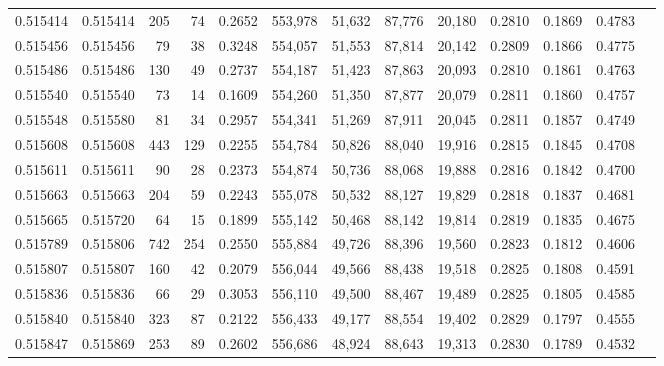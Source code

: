\begin{tabular}{rrrrrrrrrrrrr}
0.515414 & 0.515414 &   205 &    74 &                                     0.2652 & 553,978 &  51,632 &  87,776 &  20,180 & 0.2810 & 0.1869 & 0.4783 \\
0.515456 & 0.515456 &    79 &    38 &                                     0.3248 & 554,057 &  51,553 &  87,814 &  20,142 & 0.2809 & 0.1866 & 0.4775 \\
0.515486 & 0.515486 &   130 &    49 &                                     0.2737 & 554,187 &  51,423 &  87,863 &  20,093 & 0.2810 & 0.1861 & 0.4763 \\
0.515540 & 0.515540 &    73 &    14 &                                     0.1609 & 554,260 &  51,350 &  87,877 &  20,079 & 0.2811 & 0.1860 & 0.4757 \\
0.515548 & 0.515580 &    81 &    34 &                                     0.2957 & 554,341 &  51,269 &  87,911 &  20,045 & 0.2811 & 0.1857 & 0.4749 \\
0.515608 & 0.515608 &   443 &   129 &                                     0.2255 & 554,784 &  50,826 &  88,040 &  19,916 & 0.2815 & 0.1845 & 0.4708 \\
0.515611 & 0.515611 &    90 &    28 &                                     0.2373 & 554,874 &  50,736 &  88,068 &  19,888 & 0.2816 & 0.1842 & 0.4700 \\
0.515663 & 0.515663 &   204 &    59 &                                     0.2243 & 555,078 &  50,532 &  88,127 &  19,829 & 0.2818 & 0.1837 & 0.4681 \\
0.515665 & 0.515720 &    64 &    15 &                                     0.1899 & 555,142 &  50,468 &  88,142 &  19,814 & 0.2819 & 0.1835 & 0.4675 \\
0.515789 & 0.515806 &   742 &   254 &                                     0.2550 & 555,884 &  49,726 &  88,396 &  19,560 & 0.2823 & 0.1812 & 0.4606 \\
0.515807 & 0.515807 &   160 &    42 &                                     0.2079 & 556,044 &  49,566 &  88,438 &  19,518 & 0.2825 & 0.1808 & 0.4591 \\
0.515836 & 0.515836 &    66 &    29 &                                     0.3053 & 556,110 &  49,500 &  88,467 &  19,489 & 0.2825 & 0.1805 & 0.4585 \\
0.515840 & 0.515840 &   323 &    87 &                                     0.2122 & 556,433 &  49,177 &  88,554 &  19,402 & 0.2829 & 0.1797 & 0.4555 \\
0.515847 & 0.515869 &   253 &    89 &                                     0.2602 & 556,686 &  48,924 &  88,643 &  19,313 & 0.2830 & 0.1789 & 0.4532 \\

\end{tabular}

